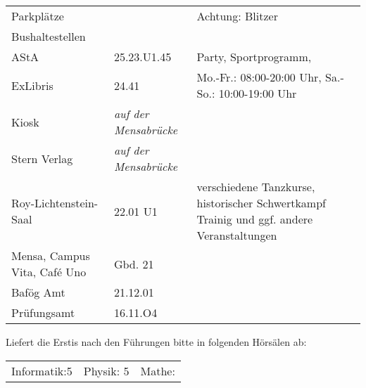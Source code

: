 \documentclass[a4paper,10pt]{article}
\begin{document}
\begin{tabularx}{\textwidth}{p{}p{}p{}}
 Parkplätze & & Achtung: Blitzer \\
 Bushaltestellen & & \\
 AStA & 25.23.U1.45 & Party, Sportprogramm, \\
 ExLibris & 24.41 & Mo.-Fr.: 08:00-20:00 Uhr, Sa.-So.: 10:00-19:00 Uhr \\
 Kiosk &  \textit{auf der Mensabrücke} & \\
 Stern Verlag & \textit{auf der Mensabrücke} & \\
 Roy-Lichtenstein-Saal & 22.01 U1 & verschiedene Tanzkurse, historischer Schwertkampf Trainig und ggf. andere Veranstaltungen \\
 Mensa, Campus Vita, Café Uno & Gbd. 21 & \\
 Bafög Amt & 21.12.01 & \\
 Prüfungsamt & 16.11.O4 &
\end{tabularx}

Liefert die Erstis nach den Führungen bitte in folgenden Hörsälen ab:\\ \vspace{\baselineskip}
\hspace{-4mm}
\begin{tabularx}{\textwidth}{p{}p{}p{}}
Informatik:5 & Physik: 5 & Mathe: 
\end{tabularx}
\end{document}
